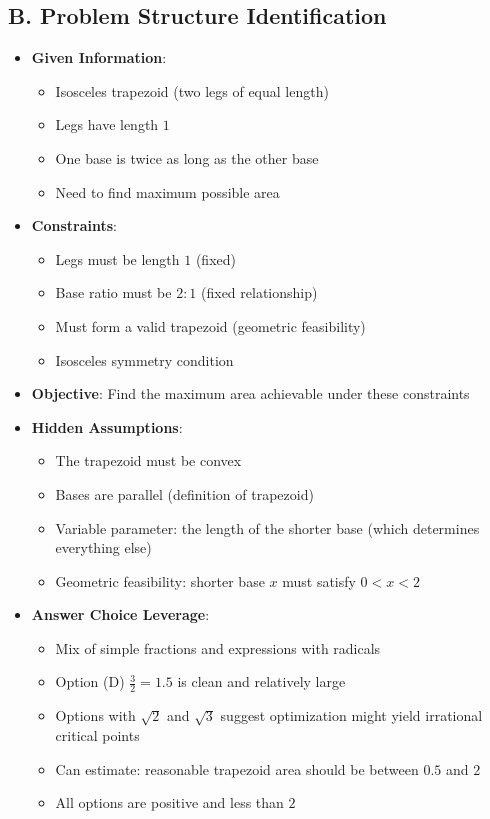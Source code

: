 \documentclass[12pt]{article}
\begin{document}
\begin{problemconfigbox}
\subsection*{B. Problem Structure Identification}
\begin{itemize}[leftmargin=*]
    \item \textbf{Given Information}: 
    \begin{itemize}
        \item Isosceles trapezoid (two legs of equal length)
        \item Legs have length $1$
        \item One base is twice as long as the other base
        \item Need to find maximum possible area
    \end{itemize}
    \item \textbf{Constraints}: 
    \begin{itemize}
        \item Legs must be length $1$ (fixed)
        \item Base ratio must be $2:1$ (fixed relationship)
        \item Must form a valid trapezoid (geometric feasibility)
        \item Isosceles symmetry condition
    \end{itemize}
    \item \textbf{Objective}: Find the maximum area achievable under these constraints
    \item \textbf{Hidden Assumptions}: 
    \begin{itemize}
        \item The trapezoid must be convex
        \item Bases are parallel (definition of trapezoid)
        \item Variable parameter: the length of the shorter base (which determines everything else)
        \item Geometric feasibility: shorter base $x$ must satisfy $0 < x < 2$
    \end{itemize}
    \item \textbf{Answer Choice Leverage}: 
    \begin{itemize}
        \item Mix of simple fractions and expressions with radicals
        \item Option (D) $\frac{3}{2} = 1.5$ is clean and relatively large
        \item Options with $\sqrt{2}$ and $\sqrt{3}$ suggest optimization might yield irrational critical points
        \item Can estimate: reasonable trapezoid area should be between $0.5$ and $2$
        \item All options are positive and less than $2$
    \end{itemize}
\end{itemize}


\end{problemconfigbox}
\end{document}
